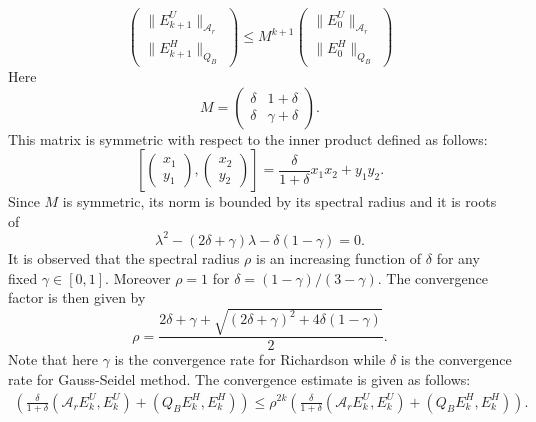\begin{equation}
\begin{pmatrix} 
\|E^U_{k+1}\|_{\mathcal{A}_r} \\
\|E^H_{k+1}\|_{Q_B}
\end{pmatrix} \leq M^{k+1}  
\begin{pmatrix} 
\|E^U_{0}\|_{\mathcal{A}_r} \\
\|E^H_{0}\|_{Q_B}
\end{pmatrix}  
\end{equation}
Here 
\begin{equation}
M = \begin{pmatrix} 
\delta & 1 + \delta \\ \delta & \gamma + \delta 
\end{pmatrix}. 
\end{equation}
This matrix is symmetric with respect to the inner product defined as follows: 
\begin{equation}
\left [ \begin{pmatrix} x_1 \\ y_1 \end{pmatrix}, \begin{pmatrix}  x_2 \\ y_2 \end{pmatrix} \right ] = \frac{\delta}{1+\delta} x_1 x_2 + y_1 y_2. 
\end{equation} 
Since $M$ is symmetric, its norm is bounded by its spectral radius and it is roots of 
\begin{equation}
\lambda^2 - (2\delta + \gamma)\lambda - \delta (1 - \gamma) = 0. 
\end{equation} 
It is observed that the spectral radius $\rho$ is an increasing function of $\delta$ for any fixed $\gamma \in [0,1]$. Moreover $\rho = 1$ for $\delta = (1-\gamma)/(3-\gamma)$. The convergence factor is then given by 
\begin{equation}
\rho = \frac{2\delta + \gamma + \sqrt{ (2\delta + \gamma)^2 + 4\delta(1-\gamma)}}{2}. 
\end{equation} 
Note that here $\gamma$ is the convergence rate for Richardson while $\delta$ is the convergence rate for Gauss-Seidel method. The convergence estimate is given as follows: 
\begin{eqnarray*}
\left ( \frac{\delta}{1 + \delta} (\mathcal{A}_r E_k^U, E_k^U) + (Q_B E_k^H, E_k^H) \right ) \leq \rho^{2k} \left ( \frac{\delta}{1 + \delta} (\mathcal{A}_r E_k^U, E_k^U) + (Q_B E_k^H, E_k^H) \right ). 
\end{eqnarray*}

